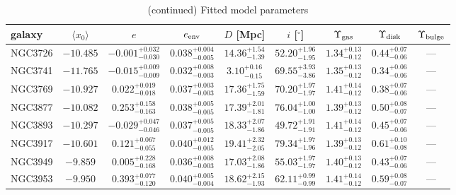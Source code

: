 \documentclass[twocolumn,tighten]{aastex63}
\begin{document}
\setcounter{table}{1}
\begin{table}
\caption{(continued) Fitted model parameters}
\begin{center}
  \begin{tabular}{lcccccccc} \hline
    galaxy  & $\langle x_0\rangle$   & $e$  & $e_{\rm env}$ & $D$ [Mpc] & $i$ [$^\circ$] & $\Upsilon_{\rm gas}$ & $\Upsilon_{\rm disk}$  & $\Upsilon_{\rm bulge}$  \\
    \hline
    NGC3726 & $ -10.485 $ & $ -0.001 _{ -0.030 } ^{ + 0.032 } $ & $ 0.038 _{ -0.005 } ^{ + 0.004 } $ & $ 14.36 _{ -1.39 } ^{ + 1.54 } $ & $ 52.20 _{ -1.95 } ^{ + 1.96 } $ & $ 1.34 _{ -0.12 } ^{ + 0.13 } $ & $ 0.44 _{ -0.06 } ^{ + 0.07 } $ & --- \\  
    NGC3741 & $ -11.765 $ & $ -0.015 _{ -0.009 } ^{ + 0.009 } $ & $ 0.032 _{ -0.003 } ^{ + 0.008 } $ & $ 3.10 _{ -0.15 } ^{ + 0.16 } $ & $ 69.55 _{ -3.86 } ^{ + 3.93 } $ & $ 1.35 _{ -0.12 } ^{ + 0.13 } $ & $ 0.34 _{ -0.06 } ^{ + 0.06 } $ & --- \\  
    NGC3769 & $ -10.927 $ & $ 0.022 _{ -0.018 } ^{ + 0.019 } $ & $ 0.037 _{ -0.003 } ^{ + 0.003 } $ & $ 17.36 _{ -1.59 } ^{ + 1.75 } $ & $ 70.20 _{ -1.97 } ^{ + 1.97 } $ & $ 1.41 _{ -0.12 } ^{ + 0.14 } $ & $ 0.38 _{ -0.06 } ^{ + 0.07 } $ & --- \\  
    NGC3877 & $ -10.082 $ & $ 0.253 _{ -0.163 } ^{ + 0.158 } $ & $ 0.038 _{ -0.005 } ^{ + 0.005 } $ & $ 17.39 _{ -1.81 } ^{ + 2.01 } $ & $ 76.04 _{ -1.00 } ^{ + 1.00 } $ & $ 1.39 _{ -0.12 } ^{ + 0.13 } $ & $ 0.50 _{ -0.07 } ^{ + 0.08 } $ & --- \\  
    NGC3893 & $ -10.297 $ & $ -0.029 _{ -0.046 } ^{ + 0.047 } $ & $ 0.037 _{ -0.005 } ^{ + 0.005 } $ & $ 18.33 _{ -1.86 } ^{ + 2.07 } $ & $ 49.72 _{ -1.91 } ^{ + 1.91 } $ & $ 1.41 _{ -0.12 } ^{ + 0.14 } $ & $ 0.45 _{ -0.06 } ^{ + 0.07 } $ & --- \\  
    NGC3917 & $ -10.601 $ & $ 0.121 _{ -0.055 } ^{ + 0.067 } $ & $ 0.040 _{ -0.005 } ^{ + 0.012 } $ & $ 19.41 _{ -2.05 } ^{ + 2.32 } $ & $ 79.34 _{ -1.96 } ^{ + 1.97 } $ & $ 1.39 _{ -0.12 } ^{ + 0.13 } $ & $ 0.61 _{ -0.08 } ^{ + 0.10 } $ & --- \\  
    NGC3949 & $ -9.859 $ & $ 0.005 _{ -0.168 } ^{ + 0.228 } $ & $ 0.036 _{ -0.003 } ^{ + 0.008 } $ & $ 17.03 _{ -1.86 } ^{ + 2.08 } $ & $ 55.03 _{ -1.97 } ^{ + 1.97 } $ & $ 1.40 _{ -0.12 } ^{ + 0.13 } $ & $ 0.43 _{ -0.06 } ^{ + 0.07 } $ & --- \\  
    NGC3953 & $ -9.950 $ & $ 0.393 _{ -0.120 } ^{ + 0.077 } $ & $ 0.040 _{ -0.004 } ^{ + 0.005 } $ & $ 18.62 _{ -1.93 } ^{ + 2.15 } $ & $ 62.11 _{ -0.99 } ^{ + 0.99 } $ & $ 1.41 _{ -0.12 } ^{ + 0.14 } $ & $ 0.59 _{ -0.07 } ^{ + 0.08 } $ & --- \\  

\end{tabular}
\end{center}
\end{table}
\end{document}
